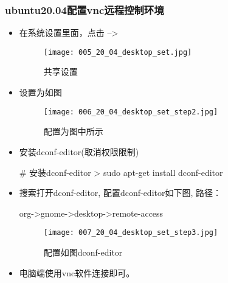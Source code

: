 \subsubsection{ubuntu20.04配置vnc远程控制环境}
\begin{itemize}

\item 在系统设置里面，点击 --> 
\begin{figure}[H]
\centering
\texttt{[image: 005\_20\_04\_desktop\_set.jpg]}
\caption{共享设置}
\end{figure}

\item 设置为如图
\begin{figure}[H]
\centering
\texttt{[image: 006\_20\_04\_desktop\_set\_step2.jpg]}
\caption{配置为图中所示}
\end{figure}

\item 安装dconf-editor(取消权限限制)
\begin{commandbox}
# 安装dconf-editor
 > sudo apt-get install dconf-editor
\end{commandbox}

\item 搜索打开dconf-editor, 配置dconf-editor如下图, 路径：
\begin{messagebox}
org->gnome->desktop->remote-access
\end{messagebox}
\begin{figure}[H]
\centering
\texttt{[image: 007\_20\_04\_desktop\_set\_step3.jpg]}
\caption{配置如图dconf-editor}
\end{figure}

\item 电脑端使用vnc软件连接即可。

\end{itemize}

